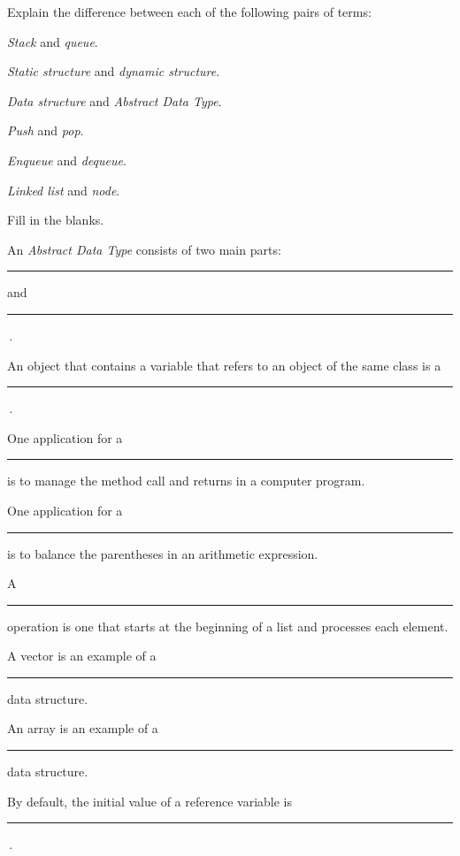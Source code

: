 \label{exercises}
\begin{EXRtwo}

\item  Explain the difference between each of the following pairs of terms:
\begin{EXRtwoLL}
\begin{multicols}{2}
\item  {\it Stack} and {\it queue}.
\item  {\it Static structure} and {\it dynamic structure}.
\item  {\it Data structure} and {\it Abstract Data Type}.
\item  {\it Push} and {\it pop}.
\item  {\it Enqueue} and {\it dequeue}.
\item  {\it Linked list} and {\it node}.
\end{multicols}
\end{EXRtwoLL}

\item  Fill in the blanks.
\begin{EXRtwoLL}\baselineskip=12.5pt
\item  An {\it Abstract Data Type} consists of two
main parts: \rule{40pt}{0.5pt} and \rule{40pt}{0.5pt}\,.
\item  An object that contains a variable that refers to an object of
the same class is a \rule{40pt}{0.5pt}\,.
\item  One application for a \rule{40pt}{0.5pt} is to manage the method
call and returns in a computer program.
\item  One application for a \rule{40pt}{0.5pt} is to balance the parentheses
in an arithmetic expression.
\item  A \rule{40pt}{0.5pt} operation is one that starts at the beginning
of a list and processes each element.
\item  A vector is an example of a \rule{40pt}{0.5pt} data structure.
\item  An array is an example of a \rule{40pt}{0.5pt} data structure.
\item  By default, the initial value of a reference variable
is \rule{40pt}{0.5pt}\,.
\end{EXRtwoLL}\baselineskip=11pt


\end{EXRtwo}
